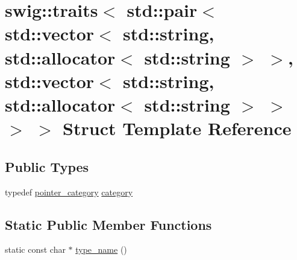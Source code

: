 \hypertarget{structswig_1_1traits_3_01std_1_1pair_3_01std_1_1vector_3_01std_1_1string_00_01std_1_1allocator_3406a9958f829b04d4a112f01ac608b27}{}\section{swig\+:\+:traits$<$ std\+:\+:pair$<$ std\+:\+:vector$<$ std\+:\+:string, std\+:\+:allocator$<$ std\+:\+:string $>$ $>$, std\+:\+:vector$<$ std\+:\+:string, std\+:\+:allocator$<$ std\+:\+:string $>$ $>$ $>$ $>$ Struct Template Reference}
\label{structswig_1_1traits_3_01std_1_1pair_3_01std_1_1vector_3_01std_1_1string_00_01std_1_1allocator_3406a9958f829b04d4a112f01ac608b27}
\subsection*{Public Types}
\begin{DoxyCompactItemize}
\item 
typedef \hyperlink{structswig_1_1pointer__category}{pointer\+\_\+category} \hyperlink{structswig_1_1traits_3_01std_1_1pair_3_01std_1_1vector_3_01std_1_1string_00_01std_1_1allocator_3406a9958f829b04d4a112f01ac608b27_a134b81c7373589c4defe1c77dae08d43}{category}
\end{DoxyCompactItemize}
\subsection*{Static Public Member Functions}
\begin{DoxyCompactItemize}
\item 
static const char $\ast$ \hyperlink{structswig_1_1traits_3_01std_1_1pair_3_01std_1_1vector_3_01std_1_1string_00_01std_1_1allocator_3406a9958f829b04d4a112f01ac608b27_aa1c6a3accd3798fd13e955da86ad77de}{type\+\_\+name} ()
\end{DoxyCompactItemize}


